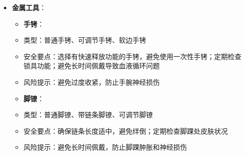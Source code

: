 \documentclass[12pt,UTF8]{ctexbook}
\begin{document}
\begin{itemize}
\begin{itemize}
\begin{itemize}
\begin{itemize}
            \item 缺点：强度略低于麻绳
            \item 适用场景：日式绳缚和西方绳缚的基础练习
          \item \textbf{棉绳}：
            \item 特点：非常柔软，触感舒适，颜色多样
            \item 优点：对皮肤友好，适合敏感肌肤，不易造成勒痕
            \item 缺点：强度较低，易打滑，吸水性强（湿水后易拉伸）
            \item 适用场景：温柔的捆绑、初学者练习、敏感部位捆绑
        \item \textbf{合成纤维绳索}：
          \item \textbf{尼龙绳}：
            \item 特点：强度高，光滑耐用，颜色丰富
            \item 优点：不易磨损，易于清洁，湿水后强度不变
            \item 缺点：摩擦力小，易打滑，透气性差
            \item 适用场景：西方绳缚、快速捆绑、户外场景
          \item \textbf{聚酯绳}：
            \item 特点：类似尼龙绳，但更硬，熔点更高
            \item 优点：强度高，耐高温，不易变形
            \item 缺点：触感较硬，透气性差
            \item 适用场景：特殊场景捆绑、需要高强度的捆绑
        \end{itemize}
      \item \textbf{金属工具}：
        \begin{itemize}
        \item \textbf{手铐}：
          \item 类型：普通手铐、可调节手铐、软边手铐
          \item 安全要点：选择有快速释放功能的手铐，避免使用一次性手铐；定期检查锁具功能；避免长时间佩戴导致血液循环问题
          \item 风险提示：避免过度收紧，防止手腕神经损伤
        \item \textbf{脚镣}：
          \item 类型：普通脚镣、带链条脚镣、可调节脚镣
          \item 安全要点：确保链条长度适中，避免绊倒；定期检查脚踝处皮肤状况
          \item 风险提示：避免长时间佩戴，防止脚踝肿胀和神经损伤

\end{itemize}
\end{itemize}
\end{itemize}
\end{itemize}
\end{document}
